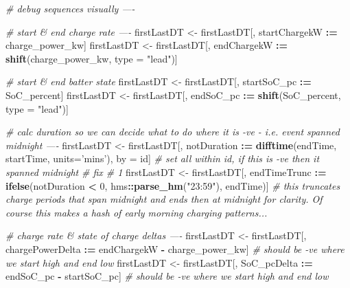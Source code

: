 \documentclass[]{article}
\newenvironment{Shaded}{\begin{snugshade}}{\end{snugshade}}
\newcommand{\CommentTok}[1]{\textcolor[rgb]{0.56,0.35,0.01}{\textit{#1}}}
\newcommand{\DataTypeTok}[1]{\textcolor[rgb]{0.13,0.29,0.53}{#1}}
\newcommand{\DecValTok}[1]{\textcolor[rgb]{0.00,0.00,0.81}{#1}}
\newcommand{\ErrorTok}[1]{\textcolor[rgb]{0.64,0.00,0.00}{\textbf{#1}}}
\newcommand{\KeywordTok}[1]{\textcolor[rgb]{0.13,0.29,0.53}{\textbf{#1}}}
\newcommand{\NormalTok}[1]{#1}
\newcommand{\OperatorTok}[1]{\textcolor[rgb]{0.81,0.36,0.00}{\textbf{#1}}}
\newcommand{\StringTok}[1]{\textcolor[rgb]{0.31,0.60,0.02}{#1}}
\begin{document}
\begin{Shaded}
\begin{Highlighting}[]
\CommentTok{# debug sequences visually ----}

\CommentTok{# start & end charge rate ----}
\NormalTok{firstLastDT <-}\StringTok{ }\NormalTok{firstLastDT[, startChargekW }\OperatorTok{:}\ErrorTok{=}\StringTok{ }\NormalTok{charge_power_kw]}
\NormalTok{firstLastDT <-}\StringTok{ }\NormalTok{firstLastDT[, endChargekW }\OperatorTok{:}\ErrorTok{=}\StringTok{ }\KeywordTok{shift}\NormalTok{(charge_power_kw, }\DataTypeTok{type =} \StringTok{"lead"}\NormalTok{)]}

\CommentTok{# start & end batter state}
\NormalTok{firstLastDT <-}\StringTok{ }\NormalTok{firstLastDT[, startSoC_pc }\OperatorTok{:}\ErrorTok{=}\StringTok{ }\NormalTok{SoC_percent]}
\NormalTok{firstLastDT <-}\StringTok{ }\NormalTok{firstLastDT[, endSoC_pc }\OperatorTok{:}\ErrorTok{=}\StringTok{ }\KeywordTok{shift}\NormalTok{(SoC_percent, }\DataTypeTok{type =} \StringTok{"lead"}\NormalTok{)]}

\CommentTok{# calc duration so we can decide what to do where it is -ve - i.e. event spanned midnight ----}
\NormalTok{firstLastDT <-}\StringTok{ }\NormalTok{firstLastDT[, notDuration }\OperatorTok{:}\ErrorTok{=}\StringTok{ }\KeywordTok{difftime}\NormalTok{(endTime, startTime, }\DataTypeTok{units=}\StringTok{'mins'}\NormalTok{), by =}\StringTok{ }\NormalTok{id] }\CommentTok{# set all within id, if this is -ve then it spanned midnight}
\CommentTok{# fix # 1}
\NormalTok{firstLastDT <-}\StringTok{ }\NormalTok{firstLastDT[, endTimeTrunc }\OperatorTok{:}\ErrorTok{=}\StringTok{ }\KeywordTok{ifelse}\NormalTok{(notDuration }\OperatorTok{<}\StringTok{ }\DecValTok{0}\NormalTok{, }
\NormalTok{                                                   hms}\OperatorTok{::}\KeywordTok{parse_hm}\NormalTok{(}\StringTok{"23:59"}\NormalTok{),}
\NormalTok{                                                   endTime)] }\CommentTok{# this truncates charge periods that span midnight and ends then at midnight for clarity. Of course this makes a hash of early morning charging patterns... }

\CommentTok{# charge rate & state of charge deltas ----}
\NormalTok{firstLastDT <-}\StringTok{ }\NormalTok{firstLastDT[, chargePowerDelta }\OperatorTok{:}\ErrorTok{=}\StringTok{ }\NormalTok{endChargekW }\OperatorTok{-}\StringTok{ }\NormalTok{charge_power_kw] }\CommentTok{# should be -ve where we start high and end low}
\NormalTok{firstLastDT <-}\StringTok{ }\NormalTok{firstLastDT[, SoC_pcDelta }\OperatorTok{:}\ErrorTok{=}\StringTok{ }\NormalTok{endSoC_pc }\OperatorTok{-}\StringTok{ }\NormalTok{startSoC_pc] }\CommentTok{# should be -ve where we start high and end low}
\end{Highlighting}
\end{Shaded}
\end{document}
